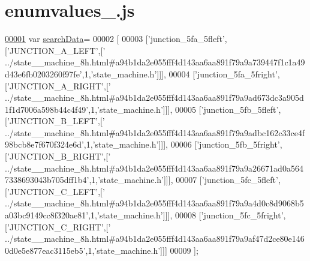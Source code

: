 \hypertarget{enumvalues__5_8js_source}{}\section{enumvalues\+\_.\+js}
\label{enumvalues__5_8js_source}

\begin{DoxyCode}
\hypertarget{enumvalues__5_8js_source.tex_l00001}{}\hyperlink{enumvalues__5_8js_ad01a7523f103d6242ef9b0451861231e}{00001} var \hyperlink{enumvalues__5_8js_ad01a7523f103d6242ef9b0451861231e}{searchData}=
00002 [
00003   [\textcolor{stringliteral}{'junction\_5fa\_5fleft'},[\textcolor{stringliteral}{'JUNCTION\_A\_LEFT'},[\textcolor{stringliteral}{'
      ../state\_\_machine\_8h.html#a94b1da2e055fff4d143aa6aa891f79a9a739447f1c1a49d43e6fb0203260f97fe'},1,\textcolor{stringliteral}{'state\_machine.h'}]]],
00004   [\textcolor{stringliteral}{'junction\_5fa\_5fright'},[\textcolor{stringliteral}{'JUNCTION\_A\_RIGHT'},[\textcolor{stringliteral}{'
      ../state\_\_machine\_8h.html#a94b1da2e055fff4d143aa6aa891f79a9ad673dc3a905d1f1d7006a598b44c4f49'},1,\textcolor{stringliteral}{'state\_machine.h'}]]],
00005   [\textcolor{stringliteral}{'junction\_5fb\_5fleft'},[\textcolor{stringliteral}{'JUNCTION\_B\_LEFT'},[\textcolor{stringliteral}{'
      ../state\_\_machine\_8h.html#a94b1da2e055fff4d143aa6aa891f79a9adbc162c33ce4f98bcb8e7f670f324e6d'},1,\textcolor{stringliteral}{'state\_machine.h'}]]],
00006   [\textcolor{stringliteral}{'junction\_5fb\_5fright'},[\textcolor{stringliteral}{'JUNCTION\_B\_RIGHT'},[\textcolor{stringliteral}{'
      ../state\_\_machine\_8h.html#a94b1da2e055fff4d143aa6aa891f79a9a26671ad0a5647338693043b705dff1b4'},1,\textcolor{stringliteral}{'state\_machine.h'}]]],
00007   [\textcolor{stringliteral}{'junction\_5fc\_5fleft'},[\textcolor{stringliteral}{'JUNCTION\_C\_LEFT'},[\textcolor{stringliteral}{'
      ../state\_\_machine\_8h.html#a94b1da2e055fff4d143aa6aa891f79a9a4d0c8d9068b5a03bc9149cc8f320ae81'},1,\textcolor{stringliteral}{'state\_machine.h'}]]],
00008   [\textcolor{stringliteral}{'junction\_5fc\_5fright'},[\textcolor{stringliteral}{'JUNCTION\_C\_RIGHT'},[\textcolor{stringliteral}{'
      ../state\_\_machine\_8h.html#a94b1da2e055fff4d143aa6aa891f79a9af47d2ce80e1460d0e5e877eac3115eb5'},1,\textcolor{stringliteral}{'state\_machine.h'}]]]
00009 ];
\end{DoxyCode}
